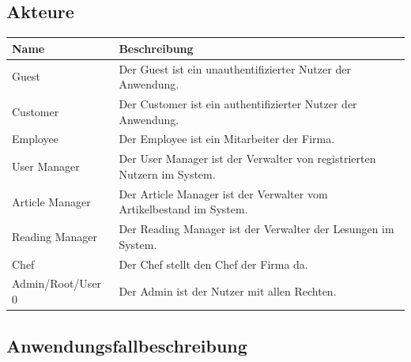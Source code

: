 \documentclass[a4paper]{article}
\begin{document}
\subsection{Akteure}

\begin{tabular}{|l|l|}
	\hline
	\rowcolor[HTML]{C0C0C0} 
	Name & Beschreibung	\\ \hline
	Guest & Der Guest ist ein unauthentifizierter Nutzer der Anwendung.\\ \hline
	Customer & Der Customer ist ein authentifizierter Nutzer der Anwendung.\\ \hline
	Employee & Der Employee ist ein Mitarbeiter der Firma.\\ \hline
	User Manager & Der User Manager ist der Verwalter von registrierten Nutzern im System.\\ \hline
	Article Manager & Der Article Manager ist der Verwalter vom Artikelbestand im System.\\ \hline
	Reading Manager & Der Reading Manager ist der Verwalter der Lesungen im System.\\ \hline
	Chef & Der Chef stellt den Chef der Firma da.\\ \hline
	Admin/Root/User 0 & Der Admin ist der Nutzer mit allen Rechten.\\ \hline
\end{tabular}

\subsection{Anwendungsfallbeschreibung}
\end{document}
